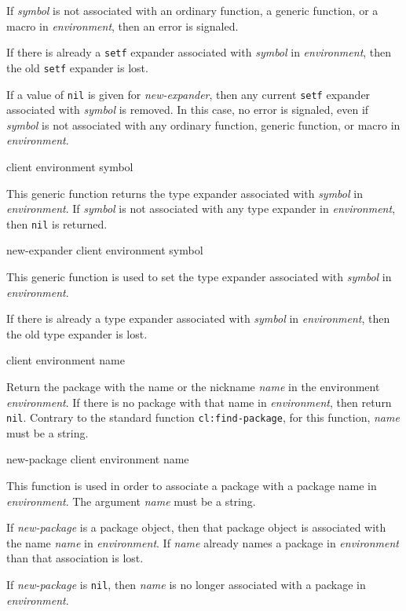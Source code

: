If \textit{symbol} is not associated with an ordinary function, a
generic function, or a macro in \textit{environment}, then an error is
signaled.

If there is already a \texttt{setf} expander associated with
\textit{symbol} in \textit{environment}, then the old \texttt{setf}
expander is lost.

If a value of \texttt{nil} is given for \textit{new-expander}, then
any current \texttt{setf} expander associated with \textit{symbol} is
removed.  In this case, no error is signaled, even if \textit{symbol}
is not associated with any ordinary function, generic function, or
macro in \textit{environment}.

 {client environment symbol}

This generic function returns the type expander associated with
\textit{symbol} in \textit{environment}.  If \textit{symbol} is not
associated with any type expander in \textit{environment}, then
\texttt{nil} is returned.

 {new-expander client environment symbol}

This generic function is used to set the type expander associated with
\textit{symbol} in \textit{environment}.

If there is already a type expander associated with \textit{symbol} in
\textit{environment}, then the old type expander is lost.

 {client environment name}

Return the package with the name or the nickname \textit{name} in the
environment \textit{environment}.  If there is no package with that
name in \textit{environment}, then return \texttt{nil}.  Contrary to
the standard \commonlisp{} function \texttt{cl:find-package}, for this
function, \textit{name} must be a string.

 {new-package client environment name}

This function is used in order to associate a package with a package
name in \textit{environment}.  The argument \textit{name} must be a
string.

If \textit{new-package} is a package object, then that package object
is associated with the name \textit{name} in
\textit{environment}.  If \textit{name} already names a package in
\textit{environment} than that association is lost.

If \textit{new-package} is \texttt{nil}, then \textit{name} is no
longer associated with a package in \textit{environment}.

